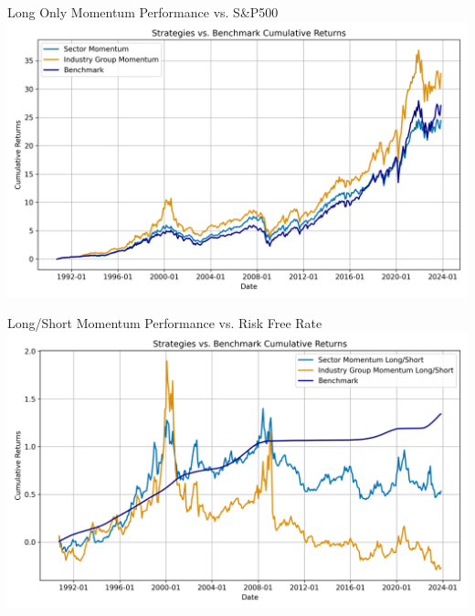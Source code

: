 \documentclass{beamer}
\begin{document}
\begin{frame}{Long Only Momentum Performance vs. S\&P500}
    \centering %
    \includegraphics[width=1\textwidth]{Figures/strategy_plot.png}    

\end{frame}

\begin{frame}{Long/Short Momentum Performance vs. Risk Free Rate}
    \centering %
    \includegraphics[width=1\textwidth]{Figures/strategy_plot_long_short.png}    

\end{frame}
\end{document}
